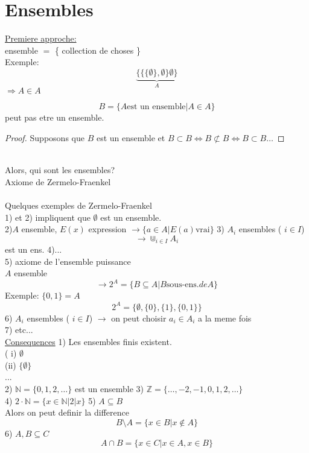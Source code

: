 \documentclass[../main.tex]{subfiles}
\begin{document}
\section{Ensembles}
\underline{Premiere approche:}\\
ensemble $=$ \{ collection de choses \}\\
Exemple:\\
\[ 
	\underbrace{ \{\{ \{\emptyset\}, \emptyset \}\emptyset\} }_{A}
\]
$\Rightarrow A \in A$ 
\begin{propo}\label{propo:paradoxe_de_russel}
\[ 
	B = \{ A \text{est un ensemble} \vert A \in A\}
\]
peut pas etre un ensemble.
\end{propo}
\begin{proof}
Supposons que $B$ est un ensemble et $B \subset B \iff B \not\subset B \iff B \subset B \ldots$ 
\end{proof}
\\
Alors, qui sont les ensembles?
\\
Axiome de Zermelo-Fraenkel\\
\hr\\
Quelques exemples de Zermelo-Fraenkel\\
1) et 2) impliquent que $\emptyset$ est un ensemble.\\
2)$A$ ensemble, $E(x)$ expression
$\rightarrow \{a \in A \vert E(a) \text{vrai}\}$
3) $A_i$ ensembles ( $i \in I$)\\
\[ 
	\rightarrow \Cup_{i\in I}  A_i
\]
est un ens.
4)...\\
5) axiome de l'ensemble puissance\\
$A$ ensemble
\[ 
	\rightarrow 2^{A} = \{ B \subseteq A \vert B \text{sous-ens.} de A\}
\]
Exemple: $\{0,1\}=A$ \\

\[ 
	2^{A} = \{ \emptyset , \{0\}, \{1\}, \{0,1\}\}
\]
6) $A_i$ ensembles ( $i \in I$)
$\rightarrow$ on peut choisir $a_i \in A_i$ a la meme fois\\
7) etc...\\
\underline{Consequences}
1) Les ensembles finis existent.\\
( i)  $\emptyset$ \\
 (ii)  $\{\emptyset\}$ \\
 ...\\

 2) $\mathbb{N} = \{0,1,2,\ldots\}$ est un ensemble
 3) $\mathbb{Z}= \{\ldots,-2,-1,0,1,2,\ldots\}$\\
 4) $2 \cdot \mathbb{N} = \{x \in \mathbb{N} \vert 2 \vert x\}$
 5) $A \subseteq B$ \\
 Alors on peut definir la difference
 \[ 
	 B \setminus A = \{x \in B \vert x \not\in A\}
 \]
 6) $A,B \subseteq C$ 
 \[ 
	 A \cap B = \{x \in C \vert x \in A, x \in B\} 
 \]
 
 
\end{document}

